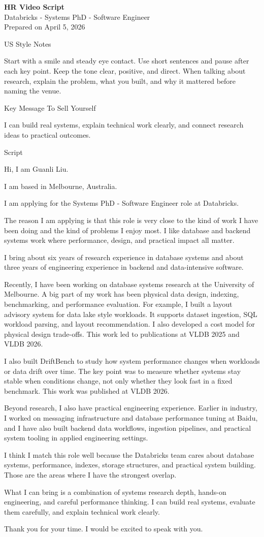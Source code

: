 \documentclass[11pt]{article}
\begin{document}
\thispagestyle{empty}
{\Large \textbf{HR Video Script}}\\
Databricks - Systems PhD - Software Engineer\\
Prepared on April 5, 2026

US Style Notes

Start with a smile and steady eye contact.
Use short sentences and pause after each key point.
Keep the tone clear, positive, and direct.
When talking about research, explain the problem, what you built, and why it mattered before naming the venue.

Key Message To Sell Yourself

I can build real systems, explain technical work clearly, and connect research ideas to practical outcomes.

Script

Hi, I am Guanli Liu.

I am based in Melbourne, Australia.

I am applying for the Systems PhD - Software Engineer role at Databricks.

The reason I am applying is that this role is very close to the kind of work I have been doing and the kind of problems I enjoy most. I like database and backend systems work where performance, design, and practical impact all matter.

I bring about six years of research experience in database systems and about three years of engineering experience in backend and data-intensive software.

Recently, I have been working on database systems research at the University of Melbourne. A big part of my work has been physical data design, indexing, benchmarking, and performance evaluation. For example, I built a layout advisory system for data lake style workloads. It supports dataset ingestion, SQL workload parsing, and layout recommendation. I also developed a cost model for physical design trade-offs. This work led to publications at VLDB 2025 and VLDB 2026.

I also built DriftBench to study how system performance changes when workloads or data drift over time. The key point was to measure whether systems stay stable when conditions change, not only whether they look fast in a fixed benchmark. This work was published at VLDB 2026.

Beyond research, I also have practical engineering experience. Earlier in industry, I worked on messaging infrastructure and database performance tuning at Baidu, and I have also built backend data workflows, ingestion pipelines, and practical system tooling in applied engineering settings.

I think I match this role well because the Databricks team cares about database systems, performance, indexes, storage structures, and practical system building. Those are the areas where I have the strongest overlap.

What I can bring is a combination of systems research depth, hands-on engineering, and careful performance thinking. I can build real systems, evaluate them carefully, and explain technical work clearly.

Thank you for your time. I would be excited to speak with you.
\end{document}
